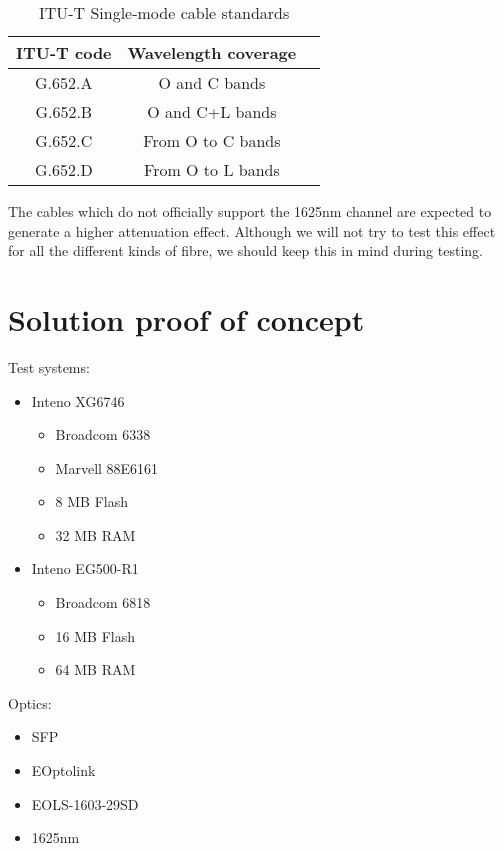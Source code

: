 \documentclass{article}
\begin{document}
\begin{table}[h]
\centering
\label{tab:single-mode_types}
\caption{ITU-T Single-mode cable standards}
\begin{tabular}{|c|c|c|}
\hline 
ITU-T code & Wavelength coverage\\ 
\hline 
G.652.A & O and C bands \\ 
\hline
G.652.B & O and C+L bands \\
\hline
G.652.C & From O to C bands \\
\hline
G.652.D & From O to L bands \\
\hline
\end{tabular} 
\end{table}

The cables which do not officially support the 1625nm channel are expected to generate a higher attenuation effect. Although we will not try to test this effect for all the different kinds of fibre, we should keep this in mind during testing.

\section{Solution proof of concept}


Test systems: 
\begin{itemize}
\item Inteno XG6746 \cite{Inteno:XG6746}
\begin{itemize}
\item Broadcom 6338
\item Marvell 88E6161
\item 8 MB Flash
\item 32 MB RAM
\end{itemize}
\item Inteno EG500-R1 \cite{Inteno:EG500}
\begin{itemize}
\item Broadcom 6818
\item 16 MB Flash
\item 64 MB RAM
\end{itemize}
\end{itemize}

Optics:
\begin{itemize}
\item SFP
\item EOptolink
\item EOLS-1603-29SD
\item 1625nm
\end{itemize}
\end{document}
